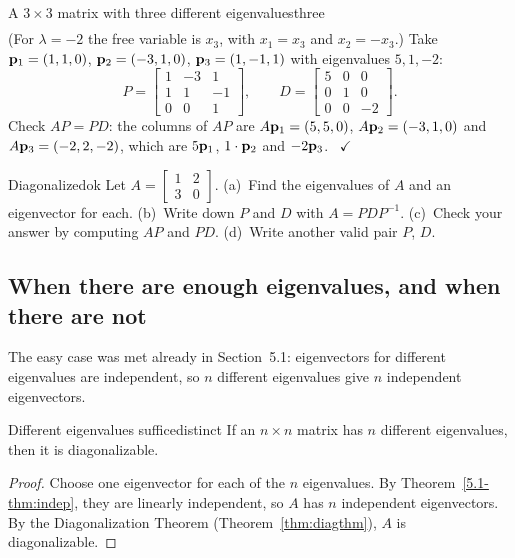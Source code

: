 \documentclass[11pt]{article}
\begin{document}
\begin{exmp}{A $3\times3$ matrix with three different eigenvalues}{three}
\begin{align*}
\end{align*}
(For $\lambda=-2$ the free variable is $x_3$, with $x_1=x_3$ and $x_2=-x_3$.) Take $\mathbf{p}_1=(1,1,0)$, $\mathbf{p}_2=(-3,1,0)$, $\mathbf{p}_3=(1,-1,1)$ with eigenvalues $5,1,-2$:
\[
P=\begin{bmatrix}1&-3&1\\1&1&-1\\0&0&1\end{bmatrix},\qquad D=\begin{bmatrix}5&0&0\\0&1&0\\0&0&-2\end{bmatrix}.
\]
Check $AP=PD$: the columns of $AP$ are $A\mathbf{p}_1=(5,5,0)$, $A\mathbf{p}_2=(-3,1,0)$ and $A\mathbf{p}_3=(-2,2,-2)$, which are $5\mathbf{p}_1$, $1\cdot\mathbf{p}_2$ and $-2\mathbf{p}_3$. \ $\checkmark$
\end{exmp}

\begin{kc}{Diagonalize}{dok}
Let $A=\begin{bmatrix}1&2\\3&0\end{bmatrix}$. (a)~Find the eigenvalues of $A$ and an eigenvector for each. (b)~Write down $P$ and $D$ with $A=PDP^{-1}$. (c)~Check your answer by computing $AP$ and $PD$. (d)~Write another valid pair $P$, $D$.
\end{kc}

\subsection*{When there are enough eigenvalues, and when there are not}

The easy case was met already in Section~5.1: eigenvectors for different eigenvalues are independent, so $n$ different eigenvalues give $n$ independent eigenvectors.

\begin{thm}{Different eigenvalues suffice}{distinct}
If an $n\times n$ matrix has $n$ different eigenvalues, then it is diagonalizable.
\end{thm}

\begin{proof}
Choose one eigenvector for each of the $n$ eigenvalues. By Theorem~\ref{5.1-thm:indep}, they are linearly independent, so $A$ has $n$ independent eigenvectors. By the Diagonalization Theorem (Theorem~\ref{thm:diagthm}), $A$ is diagonalizable.
\end{proof}
\end{document}
